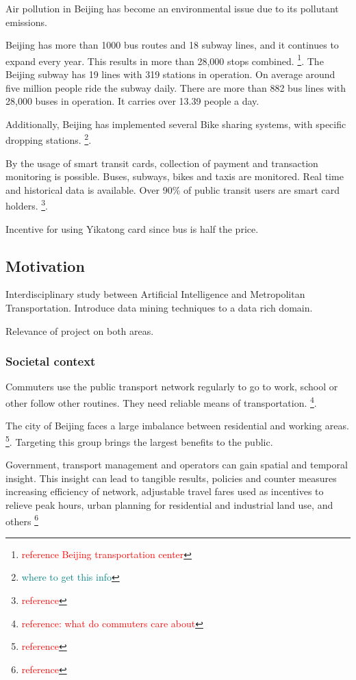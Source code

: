 \documentclass{article}
\newcommand{\selfnote}[1]{\footnote{\textcolor{red}{#1}}}
\newcommand{\domainDoubt}[1]{\footnote{\textcolor{teal}{#1}}}
\begin{document}
Air pollution in Beijing has become an environmental issue due to its pollutant emissions. \cite{zhang2016air}

Beijing has more than 1000 bus routes and 18 subway lines, and it continues to expand every year. This results in more than 28,000 stops combined. \selfnote{reference Beijing transportation center}. 
The Beijing subway has 19 lines with 319 stations in operation. On average around five million people ride the subway daily.
There are more than 882 bus lines with 28,000 buses in operation. It carries over 13.39 people a day.

Additionally, Beijing has implemented several Bike sharing systems, with specific dropping stations. \domainDoubt{where to get this info}.

By the usage of smart transit cards, collection of payment and transaction monitoring is possible. Buses, subways, bikes and taxis are monitored. Real time and historical data is available. Over 90\% of public transit users are smart card holders. \selfnote{reference}.

Incentive for using Yikatong card since bus is half the price. 

\subsection{Motivation}
Interdisciplinary study between Artificial Intelligence and Metropolitan Transportation. Introduce data mining techniques to a data rich domain. 

Relevance of project on both areas. 

\subsubsection{Societal context}
Commuters use the public transport network regularly to go to work, school or other follow other routines. They need reliable means of transportation. \selfnote{reference: what do commuters care about}.

The city of Beijing faces a large imbalance between residential and working areas. \selfnote{reference}. Targeting this group brings the largest benefits to the public.  

Government, transport management and operators can gain spatial and temporal insight. This insight can lead to tangible results, policies and counter measures increasing efficiency of network, adjustable travel fares used as incentives to relieve peak hours, urban planning for residential and industrial land use, and others \selfnote{reference}
\end{document}

